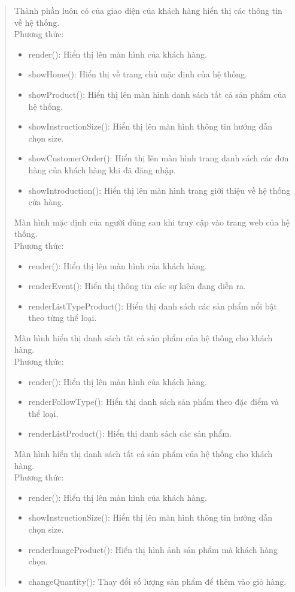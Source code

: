 \begin{quote}
	Thành phần luôn có của giao diện của khách hàng hiển thị các thông tin về hệ thống.\\
	Phương thức:
	\begin{itemize}
		\item render(): Hiển thị lên màn hình của khách hàng.
		\item showHome(): Hiển thị về trang chủ mặc định của hệ thống.
		\item showProduct(): Hiển thị lên màn hình danh sách tất cả sản phẩm của hệ thống.
		\item showInstructionSize(): Hiển thị lên màn hình thông tin hướng dẫn chọn size.
		\item showCustomerOrder(): Hiển thị lên màn hình trang danh sách các đơn hàng của khách hàng khi đã đăng nhập.
		\item showIntroduction(): Hiển thị lên màn hình trang giới thiệu về hệ thống cửa hàng.
	\end{itemize}

	Màn hình mặc định của người dùng sau khi truy cập vào trang web của hệ thống.\\
	Phương thức:
	\begin{itemize}
		\item render(): Hiển thị lên màn hình của khách hàng.
		\item renderEvent(): Hiển thị thông tin các sự kiện đang diễn ra.
		\item renderListTypeProduct(): Hiển thị danh sách các sản phẩm nổi bật theo từng thể loại.
	\end{itemize}

	Màn hình hiển thị danh sách tất cả sản phẩm của hệ thống cho khách hàng.\\
	Phương thức:
	\begin{itemize}
		\item render(): Hiển thị lên màn hình của khách hàng.
		\item renderFollowType(): Hiển thị danh sách sản phẩm theo đặc điểm và thể loại.
		\item renderListProduct(): Hiển thị danh sách các sản phẩm.
	\end{itemize}

	 Màn hình hiển thị danh sách tất cả sản phẩm của hệ thống cho khách hàng.\\
	Phương thức:
	\begin{itemize}
		\item render(): Hiển thị lên màn hình của khách hàng.
		\item showInstructionSize(): Hiển thị lên màn hình thông tin hướng dẫn chọn size.
		\item renderImageProduct(): Hiển thị hình ảnh sản phẩm mà khách hàng chọn.
		\item changeQuantity(): Thay đổi số lượng sản phẩm để thêm vào giỏ hàng.
	\end{itemize}


\end{quote}
